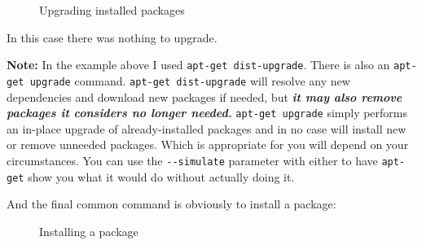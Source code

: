 \documentclass[10pt,american,]{book}
\newenvironment{Shaded}{\begin{snugshade}}{\end{snugshade}}
\newcommand{\KeywordTok}[1]{\textcolor[rgb]{0.13,0.29,0.53}{\textbf{{#1}}}}
\newcommand{\NormalTok}[1]{{#1}}
\numberwithin{figure}{chapter}
\DeclareRobustCommand{\drcap}[1]{\begin{figure}[H]\caption{#1}\end{figure}}
\renewcommand{\KeywordTok}[1]{{#1}}
\renewcommand{\NormalTok}[1]{{#1}}
\begin{document}
\drcap{Upgrading installed packages}

\begin{Shaded}
\end{Shaded}

In this case there was nothing to upgrade.

\textbf{Note:} In the example above I used
\texttt{apt-get\ dist-upgrade}. There is also an
\texttt{apt-get\ upgrade} command. \texttt{apt-get\ dist-upgrade} will
resolve any new dependencies and download new packages if needed, but
\textbf{\emph{it may also remove packages it considers no longer
needed.}} \texttt{apt-get\ upgrade} simply performs an in-place upgrade
of already-installed packages and in no case will install new or remove
unneeded packages. Which is appropriate for you will depend on your
circumstances. You can use the \texttt{-\/-simulate} parameter with
either to have \texttt{apt-get} show you what it would do without
actually doing it.

And the final common command is obviously to install a package:

\drcap{Installing a package}
\end{document}
